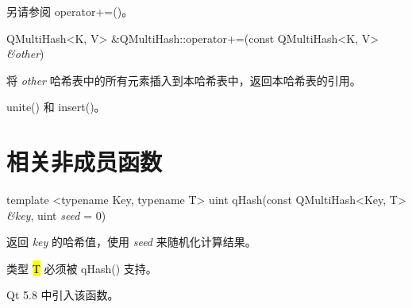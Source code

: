 \begin{seeAlso}
另请参阅 operator+=()。
\end{seeAlso}

QMultiHash<K, V> \&QMultiHash::operator+=(const QMultiHash<K, V> \emph{\&other})

将 \emph{other} 哈希表中的所有元素插入到本哈希表中，返回本哈希表的引用。

\begin{seeAlso}
unite() 和 insert()。
\end{seeAlso}

\section{相关非成员函数}

template <typename Key, typename T> uint qHash(const QMultiHash<Key, T> \emph{\&key}, uint \emph{seed} = 0)

返回 \emph{key} 的哈希值，使用 \emph{seed} 来随机化计算结果。

类型 \hl{T} 必须被 qHash() 支持。

Qt 5.8 中引入该函数。